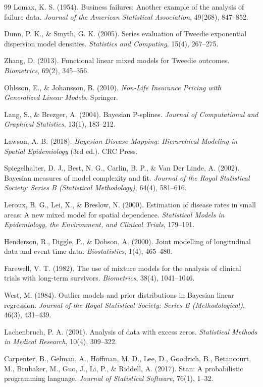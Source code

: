 \documentclass[11pt, a4paper]{article}
\begin{document}
\begin{thebibliography}{99}
 Lomax, K. S. (1954). Business failures: Another example of the analysis of failure data. \textit{Journal of the American Statistical Association}, 49(268), 847--852.

 Dunn, P. K., \& Smyth, G. K. (2005). Series evaluation of Tweedie exponential dispersion model densities. \textit{Statistics and Computing}, 15(4), 267--275.

 Zhang, D. (2013). Functional linear mixed models for Tweedie outcomes. \textit{Biometrics}, 69(2), 345--356.

 Ohlsson, E., \& Johansson, B. (2010). \textit{Non-Life Insurance Pricing with Generalized Linear Models}. Springer.

 Lang, S., \& Brezger, A. (2004). Bayesian P-splines. \textit{Journal of Computational and Graphical Statistics}, 13(1), 183--212.

 Lawson, A. B. (2018). \textit{Bayesian Disease Mapping: Hierarchical Modeling in Spatial Epidemiology} (3rd ed.). CRC Press.

 Spiegelhalter, D. J., Best, N. G., Carlin, B. P., \& Van Der Linde, A. (2002). Bayesian measures of model complexity and fit. \textit{Journal of the Royal Statistical Society: Series B (Statistical Methodology)}, 64(4), 581--616.

 Leroux, B. G., Lei, X., \& Breslow, N. (2000). Estimation of disease rates in small areas: A new mixed model for spatial dependence. \textit{Statistical Models in Epidemiology, the Environment, and Clinical Trials}, 179--191.

 Henderson, R., Diggle, P., \& Dobson, A. (2000). Joint modelling of longitudinal data and event time data. \textit{Biostatistics}, 1(4), 465--480.

 Farewell, V. T. (1982). The use of mixture models for the analysis of clinical trials with long-term survivors. \textit{Biometrics}, 38(4), 1041--1046.

 West, M. (1984). Outlier models and prior distributions in Bayesian linear regression. \textit{Journal of the Royal Statistical Society: Series B (Methodological)}, 46(3), 431--439.

 Lachenbruch, P. A. (2001). Analysis of data with excess zeros. \textit{Statistical Methods in Medical Research}, 10(4), 309--322.

 Carpenter, B., Gelman, A., Hoffman, M. D., Lee, D., Goodrich, B., Betancourt, M., Brubaker, M., Guo, J., Li, P., \& Riddell, A. (2017). Stan: A probabilistic programming language. \textit{Journal of Statistical Software}, 76(1), 1--32.


\end{thebibliography}
\end{document}
